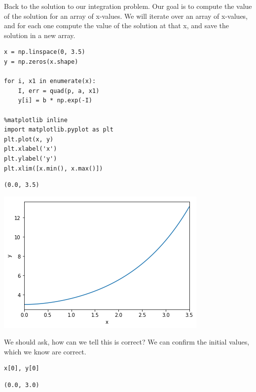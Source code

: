 \documentclass[11pt]{article}
\begin{document}
Back to the solution to our integration problem. Our goal is to compute the value of the solution for an array of x-values. We will iterate over an array of x-values, and for each one compute the value of the solution at that x, and save the solution in a new array.

\begin{verbatim}
x = np.linspace(0, 3.5)
y = np.zeros(x.shape)

for i, x1 in enumerate(x):
    I, err = quad(p, a, x1)
    y[i] = b * np.exp(-I)

%matplotlib inline
import matplotlib.pyplot as plt
plt.plot(x, y)
plt.xlabel('x')
plt.ylabel('y')
plt.xlim([x.min(), x.max()])
\end{verbatim}

\begin{verbatim}
(0.0, 3.5)
\end{verbatim}



\begin{center}
\includegraphics[width=.9\linewidth]{obipy-resources/744bcb3e58866fd0750c7a1efd9d42e8-68311qjJ.png}
\end{center}

We should ask, how can we tell this is correct? We can confirm the initial values, which we know are correct.

\begin{verbatim}
x[0], y[0]
\end{verbatim}

\begin{verbatim}
(0.0, 3.0)
\end{verbatim}
\end{document}
